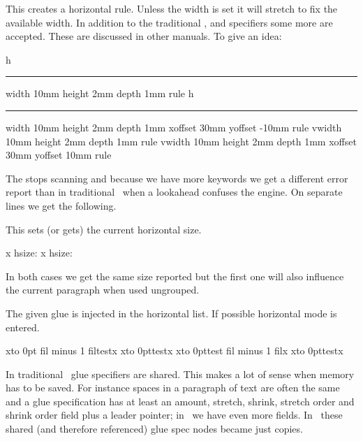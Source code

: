 This creates a horizontal rule. Unless the width is set it will stretch to fix
the available width. In addition to the traditional , 
and  specifiers some more are accepted. These are discussed in other
manuals. To give an idea:

\startbuffer
h\hrule width 10mm height 2mm depth 1mm \relax rule
h\hrule width 10mm height 2mm depth 1mm xoffset 30mm yoffset -10mm \relax rule
v\vrule width 10mm height 2mm depth 1mm \relax rule
v\vrule width 10mm height 2mm depth 1mm xoffset 30mm yoffset  10mm \relax rule
\stopbuffer

\typebuffer

The  stops scanning and because we have more keywords we get a
different error report than in traditional \TEX\ when a lookahead confuses the
engine. On separate lines we get the following.

\startlines
\getbuffer
\stoplines

\stopoldprimitive

\startoldprimitive[title={\prm {hsize}}]

This sets (or gets) the current horizontal size.

\startbuffer
\hsize 40pt \vbox{x} hsize: \the{}
\vbox{\hsize 40pt x} hsize: \the{}
\stopbuffer

\typebuffer

In both cases we get the same size reported but the first one will also influence
the current paragraph when used ungrouped.

\startlines
\getbuffer
\stoplines

\stopoldprimitive

\startoldprimitive[title={\prm {hskip}}]

The given glue is injected in the horizontal list. If possible horizontal mode is
entered.

\stopoldprimitive

\startoldprimitive[title={\prm {hss}}]

\startbuffer
x\hbox to 0pt{ fil minus 1 fil\relax test}x
x\hbox to 0pt{\hss test}x
x\hbox to 0pt{test fil minus 1 fil\relax}x
x\hbox to 0pt{test\hss}x
\stopbuffer

In traditional \TEX\ glue specifiers are shared. This makes a lot of sense when
memory has to be saved. For instance spaces in a paragraph of text are often the
same and a glue specification has at least an amount, stretch, shrink, stretch
order and shrink order field plus a leader pointer; in \LUAMETATEX\ we have even
more fields. In \LUATEX\ these shared (and therefore referenced) glue spec nodes
became just copies.

